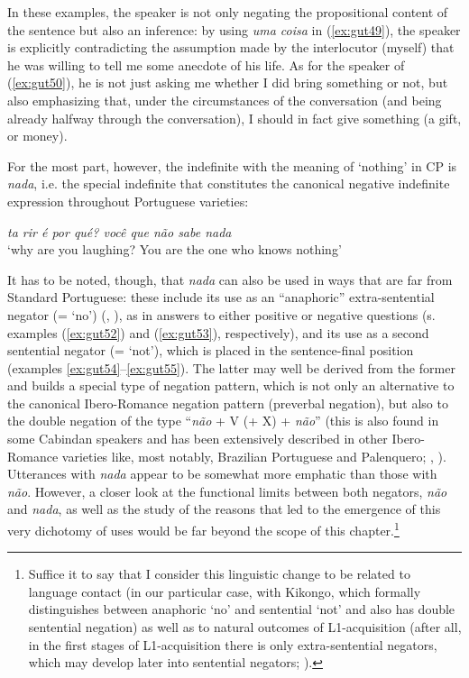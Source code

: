 \documentclass[output=paper,colorlinks,citecolor=brown]{langscibook}
\begin{document}
In these examples, the speaker is not only negating the propositional content of the sentence but also an inference: by using \textit{uma coisa} in (\ref{ex:gut49}), the speaker is explicitly contradicting the assumption made by the interlocutor (myself) that he was willing to tell me some anecdote of his life. As for the speaker of (\ref{ex:gut50}), he is not just asking me whether I did bring something or not, but also emphasizing that, under the circumstances of the conversation (and being already halfway through the conversation), I should in fact give something (a gift, or money).

For the most part, however, the indefinite with the meaning of ‘nothing’ in CP is \textit{nada}, i.e. the special indefinite that constitutes the canonical negative indefinite expression throughout Portuguese varieties: 

\ea \label{ex:gut51}
    \textit{ta rir é por qué? você que não sabe nada }\\
    ‘why are you laughing? You are the one who knows nothing’
\z

It has to be noted, though, that \textit{nada} can also be used in ways that are far from Standard Portuguese: these include its use as an “anaphoric” extra-sentential negator (= ‘no’) (\cite[][51--52]{Bosque1989}, \cite{Zanuttini1990}), as in answers to either positive or negative questions (s. examples (\ref{ex:gut52}) and (\ref{ex:gut53}), respectively), and its use as a second sentential negator (= ‘not’), which is placed in the sentence-final position (examples \ref{ex:gut54}--\ref{ex:gut55}). The latter may well be derived from the former and builds a special type of negation pattern, which is not only an alternative to the canonical Ibero\hyp Romance negation pattern (preverbal negation), but also to the double negation of the type “\textit{não} + V (+ X) + \textit{não}” (this is also found in some Cabindan speakers and has been extensively described in other Ibero\hyp Romance varieties like, most notably, Brazilian Portuguese and Palenquero; \cite{Schwegler2016b}, \cite{Schwenter2016}). Utterances with \textit{nada} appear to be somewhat more emphatic than those with \textit{não}. However, a closer look at the functional limits between both negators, \textit{não} and \textit{nada}, as well as the study of the reasons that led to the emergence of this very dichotomy of uses would be far beyond the scope of this chapter.\footnote{Suffice it to say that I consider this linguistic change to be related to language contact (in our particular case, with Kikongo, which formally distinguishes between anaphoric ‘no’ and sentential ‘not’ and also has double sentential negation) as well as to natural outcomes of L1-acquisition (after all, in the first stages of L1-acquisition there is only extra-sentential negators, which may develop later into sentential negators; \cite{Cameron-FaulknerThiekston2007}).}
\end{document}

